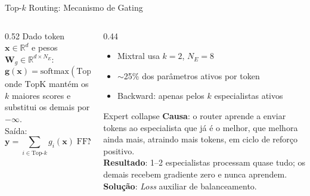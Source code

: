 \documentclass[aspectratio=169, xcolor=dvipsnames]{beamer}
\begin{document}
  \begin{frame}{Top-$k$ Routing: Mecanismo de Gating}
    \begin{columns}[T]
      \begin{column}{0.52\textwidth}
        Dado token $\mathbf{x} \in \mathbb{R}^d$ e pesos $\mathbf{W}_g \in \mathbb{R}^{d \times N_E}$:
        \[
          \mathbf{g}(\mathbf{x}) = \text{softmax}\!\left(\text{TopK}\!\left(\mathbf{x} \mathbf{W}_g,\; k\right)\right)
        \]
        onde $\text{TopK}$ mantém os $k$ maiores scores e substitui os demais por $-\infty$.\\[0.4em]
        Saída:
        \[
          \mathbf{y} = \sum_{i \in \text{Top-}k} g_i(\mathbf{x})\; \text{FFN}_i(\mathbf{x})
        \]
      \end{column}
      \begin{column}{0.44\textwidth}
      \scriptsize
        \begin{itemize}
          \item Mixtral usa $k=2$, $N_E=8$
          \item $\sim$25\% dos parâmetros ativos por token
          \item Backward: apenas pelos $k$ especialistas ativos
        \end{itemize}
        \vspace{0.3em}
        \begin{alertblock}{Expert collapse}
          \textbf{Causa}: o router aprende a enviar tokens ao especialista que já é o melhor, que melhora ainda mais, atraindo mais tokens, em ciclo de reforço positivo.\\[0.15em]
          \textbf{Resultado}: 1--2 especialistas processam quase tudo; os demais recebem gradiente zero e nunca aprendem.\\[0.15em]
          \textbf{Solução}: \textit{Loss} auxiliar de balanceamento.
        \end{alertblock}
      \end{column}
    \end{columns}
  \end{frame}
\end{document}
